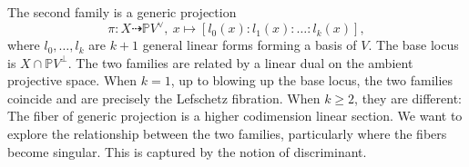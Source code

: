 \documentclass[12pt]{amsart}
\newtheorem{question}[theorem]{Question}
\begin{document}
The second family is a generic projection 
\begin{equation}\label{Intro_eqn_gen-proj}
    \pi: X\dashrightarrow \mathbb PV^{\vee}, \ x\mapsto [l_0(x):l_1(x):\ldots:l_k(x)],
\end{equation}
where $l_0,\ldots,l_k$ are $k+1$ general linear forms forming a basis of $V$. The base locus is $X\cap \mathbb PV^{\perp}$. %
The two families are related by a linear dual on the ambient projective space. When $k=1$, up to blowing up the base locus, the two families coincide and are precisely the Lefschetz fibration. When $k\ge 2$, they are different: The fiber of generic projection is a higher codimension linear section. We want to explore the relationship between the two families, particularly where the fibers become singular. This is captured by the notion of discriminant.









\end{document}
